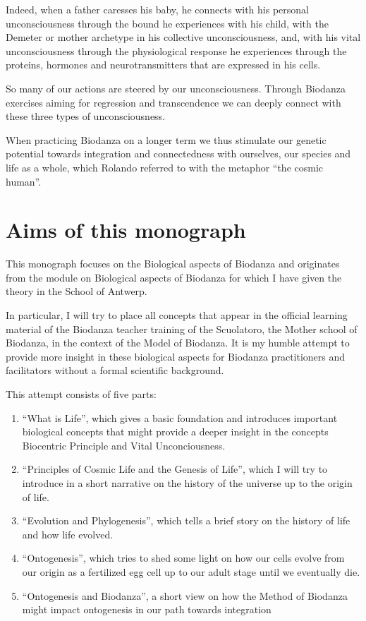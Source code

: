 \documentclass[
  11pt,
]{book}
\begin{document}
Indeed, when a father caresses his baby, he connects with
his personal unconsciousness through the bound he experiences with his child, with the Demeter or mother archetype in his collective unconsciousness, and, with his vital unconsciousness through the physiological response he experiences through the proteins, hormones and neurotransmitters that are expressed in his cells.

So many of our actions are steered by our unconsciousness.
Through Biodanza exercises aiming for regression and transcendence we can deeply connect with these three types of unconsciousness.

When practicing Biodanza on a longer term we thus stimulate our genetic potential towards integration and connectedness with ourselves, our species and life as a whole, which Rolando referred to with the metaphor ``the cosmic human''.

\newpage

\hypertarget{aims-of-this-monograph}{%
\section{Aims of this monograph}\label{aims-of-this-monograph}}

This monograph focuses on the Biological aspects of Biodanza and originates from the module on Biological aspects of Biodanza for which I have given the theory in the School of Antwerp.

In particular, I will try to place all concepts that appear in the official learning material of the Biodanza teacher training of the Scuolatoro, the Mother school of Biodanza, in the context of the Model of Biodanza. It is my humble attempt to provide more insight in these biological aspects for Biodanza practitioners and facilitators without a formal scientific background.

This attempt consists of five parts:

\begin{enumerate}
\def\labelenumi{\arabic{enumi}.}
\item
  ``What is Life'', which gives a basic foundation and introduces important biological concepts that might provide a deeper insight in the concepts Biocentric Principle and Vital Unconciousness.
\item
  ``Principles of Cosmic Life and the Genesis of Life'', which I will try to introduce in a short narrative on the history of the universe up to the origin of life.
\item
  ``Evolution and Phylogenesis'', which tells a brief story on the history of life and how life evolved.
\item
  ``Ontogenesis'', which tries to shed some light on how our cells evolve from our origin as a fertilized egg cell up to our adult stage until we eventually die.
\item
  ``Ontogenesis and Biodanza'', a short view on how the Method of Biodanza might impact ontogenesis in our path towards integration
\end{enumerate}
\end{document}
